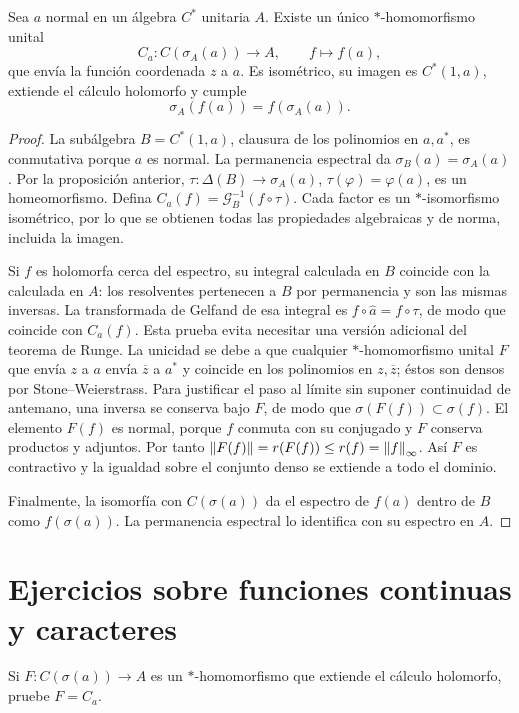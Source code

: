 \begin{teorema}\label{v3:calculo-continuo}
Sea $a$ normal en un álgebra $C^*$ unitaria $A$. Existe un único $*$-homomorfismo unital
\[
 C_a:C(\sigma_A(a))\longrightarrow A,\qquad f\longmapsto f(a),
\]
que envía la función coordenada $z$ a $a$. Es isométrico, su imagen es $C^*(1,a)$, extiende el cálculo holomorfo y cumple
\[
 \sigma_A(f(a))=f(\sigma_A(a)).
\]
\end{teorema}
\begin{proof}
La subálgebra $B=C^*(1,a)$, clausura de los polinomios en $a,a^*$, es conmutativa porque $a$ es normal. La permanencia espectral da $\sigma_B(a)=\sigma_A(a)$. Por la proposición anterior, $\tau:\Delta(B)\to\sigma_A(a)$, $\tau(\varphi)=\varphi(a)$, es un homeomorfismo. Defina $C_a(f)=\mathcal G_B^{-1}(f\circ\tau)$. Cada factor es un $*$-isomorfismo isométrico, por lo que se obtienen todas las propiedades algebraicas y de norma, incluida la imagen.

Si $f$ es holomorfa cerca del espectro, su integral calculada en $B$ coincide con la calculada en $A$: los resolventes pertenecen a $B$ por permanencia y son las mismas inversas. La transformada de Gelfand de esa integral es $f\circ\widehat a=f\circ\tau$, de modo que coincide con $C_a(f)$. Esta prueba evita necesitar una versión adicional del teorema de Runge. La unicidad se debe a que cualquier $*$-homomorfismo unital $F$ que envía $z$ a $a$ envía $\overline z$ a $a^*$ y coincide en los polinomios en $z,\overline z$; éstos son densos por Stone--Weierstrass. Para justificar el paso al límite sin suponer continuidad de antemano, una inversa se conserva bajo $F$, de modo que $\sigma(F(f))\subset\sigma(f)$. El elemento $F(f)$ es normal, porque $f$ conmuta con su conjugado y $F$ conserva productos y adjuntos. Por tanto $\left\lVert F(f)\right\rVert=r(F(f))\le r(f)=\left\lVert f\right\rVert_\infty$. Así $F$ es contractivo y la igualdad sobre el conjunto denso se extiende a todo el dominio.

Finalmente, la isomorfía con $C(\sigma(a))$ da el espectro de $f(a)$ dentro de $B$ como $f(\sigma(a))$. La permanencia espectral lo identifica con su espectro en $A$.
\end{proof}

\section{Ejercicios sobre funciones continuas y caracteres}

\begin{ejercicio}\label{ej:v3-l26-1}
Si $F:C(\sigma(a))\to A$ es un $*$-homomorfismo que extiende el cálculo holomorfo, pruebe $F=C_a$.
\end{ejercicio}


